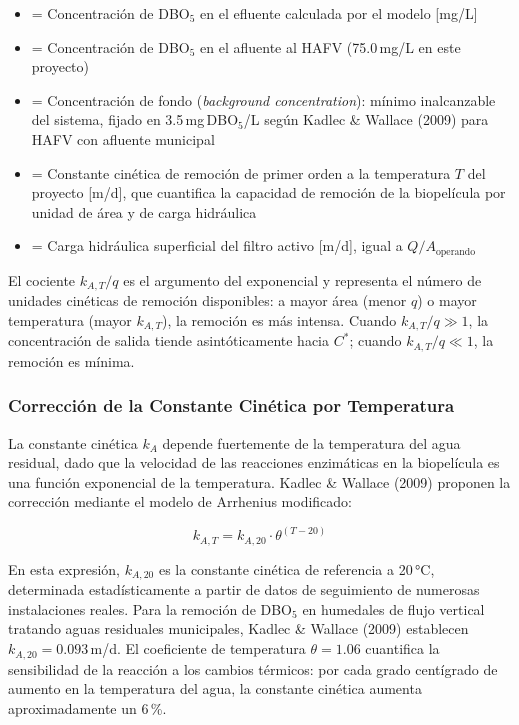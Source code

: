 \documentclass[12pt,a4paper]{article}
\begin{document}
\begin{itemize}[noitemsep,leftmargin=2em]
    \item[$C_e$] = Concentración de DBO$_5$ en el efluente calculada por el modelo [mg/L]
    \item[$C_i$] = Concentración de DBO$_5$ en el afluente al HAFV (75.0\,mg/L en este proyecto)
    \item[$C^*$] = Concentración de fondo (\textit{background concentration}): mínimo inalcanzable del sistema, fijado en 3.5\,mg\,DBO$_5$/L según Kadlec \& Wallace (2009) para HAFV con afluente municipal
    \item[$k_{A,T}$] = Constante cinética de remoción de primer orden a la temperatura $T$ del proyecto [m/d], que cuantifica la capacidad de remoción de la biopelícula por unidad de área y de carga hidráulica
    \item[$q$] = Carga hidráulica superficial del filtro activo [m/d], igual a $Q / A_\text{operando}$
\end{itemize}

El cociente $k_{A,T}/q$ es el argumento del exponencial y representa el número de unidades cinéticas de remoción disponibles: a mayor área (menor $q$) o mayor temperatura (mayor $k_{A,T}$), la remoción es más intensa. Cuando $k_{A,T}/q \gg 1$, la concentración de salida tiende asintóticamente hacia $C^*$; cuando $k_{A,T}/q \ll 1$, la remoción es mínima.

\subsubsection*{Corrección de la Constante Cinética por Temperatura}

La constante cinética $k_A$ depende fuertemente de la temperatura del agua residual, dado que la velocidad de las reacciones enzimáticas en la biopelícula es una función exponencial de la temperatura. Kadlec \& Wallace (2009) proponen la corrección mediante el modelo de Arrhenius modificado:

\begin{equation}
k_{A,T} = k_{A,20} \cdot \theta^{(T-20)}
\label{eq:arrhenius}
\end{equation}

En esta expresión, $k_{A,20}$ es la constante cinética de referencia a 20\,°C, determinada estadísticamente a partir de datos de seguimiento de numerosas instalaciones reales. Para la remoción de DBO$_5$ en humedales de flujo vertical tratando aguas residuales municipales, Kadlec \& Wallace (2009) establecen $k_{A,20} = 0.093$\,m/d. El coeficiente de temperatura $\theta = 1.06$ cuantifica la sensibilidad de la reacción a los cambios térmicos: por cada grado centígrado de aumento en la temperatura del agua, la constante cinética aumenta aproximadamente un 6\,\%.
\end{document}
